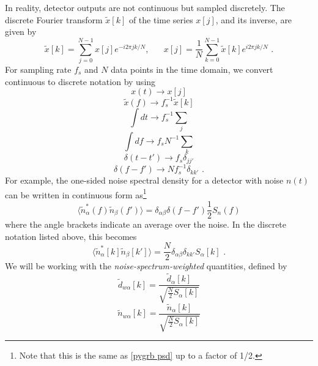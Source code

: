 \documentclass[11pt]{cuthesis}
\newcommand{\fs}{\text{ .}}
\begin{document}
In reality, detector outputs are not continuous but sampled discretely. The discrete Fourier transform $\tilde{x}[k]$ of the time series $x[j]$, and its inverse, are given by
\begin{equation}
\tilde{x}[k]=\sum^{N-1}_{j=0} x[j] e^{-i 2\pi jk/N}, \hspace{20pt}x[j]=\frac{1}{N}\sum^{N-1}_{k=0} \tilde{x}[k] e^{i2 \pi jk/N} \fs
\end{equation}
For sampling rate $f_s$ and $N$ data points in the time domain, we convert continuous to discrete notation by using
\begin{equation}
x(t)\rightarrow x[j]
\end{equation} 
\begin{equation}
\tilde{x}(f)\rightarrow f_s^{-1} \tilde{x}[k]
\end{equation} 
\begin{equation}
\int dt \rightarrow f_s^{-1}\sum_j
\end{equation} 
\begin{equation}
\int df \rightarrow f_s N^{-1} \sum_k
\end{equation} 
\begin{equation}
\delta(t-t')\rightarrow f_s \delta_{jj'}
\end{equation}
\begin{equation}
\delta(f-f')\rightarrow N f_s^{-1}\delta_{kk'} \fs
\end{equation}  
For example, the one-sided noise spectral density for a detector with noise $n(t)$ can be written in continuous form as\footnote{Note that this is the same as \ref{pygrb psd} up to a factor of 1/2.}
\begin{equation}
\langle  \tilde{n}^*_\alpha (f) \tilde{n}_\beta (f') \rangle = \delta_{\alpha \beta} \delta (f-f') \frac{1}{2} S_n (f)
\end{equation}
where the angle brackets indicate an average over the noise. In the discrete notation listed above, this becomes
\begin{equation}
\langle  \tilde{n}^*_\alpha [k] \tilde{n}_\beta [k']  \rangle = \frac{N}{2} \delta _{\alpha \beta} \delta _{k k'} S_\alpha [k] \fs
\end{equation}
We will be working with the \emph{noise-spectrum-weighted} quantities, defined by
\begin{equation}
\tilde{d}_{w\alpha}[k]=\frac{\tilde{d}_\alpha [k]}{\sqrt{\frac{N}{2}S_\alpha [k]}}
\end{equation}
\begin{equation}
\tilde{n}_{w\alpha}[k]=\frac{\tilde{n}_\alpha [k]}{\sqrt{\frac{N}{2}S_\alpha [k]}}
\end{equation}
\end{document}
